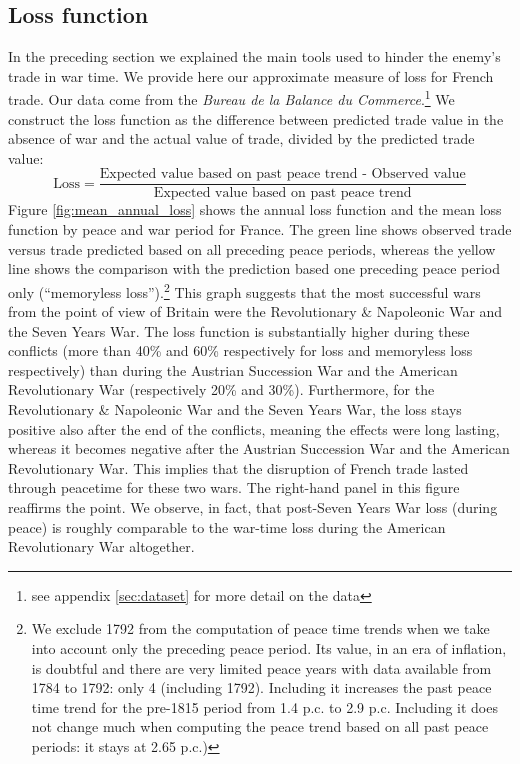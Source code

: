 \documentclass[12pt,a4paper,notitlepage,english]{article}
\begin{document}
\subsection{Loss function}
\label{sec:loss}
In the preceding section we explained the main tools used to hinder the enemy's trade in war time. We provide here our approximate measure of loss for French trade. Our data come from the \textit{Bureau de la Balance du Commerce}.\footnote{see appendix \ref{sec:dataset} for more detail on the data} We construct the loss function as the difference between predicted trade value in the absence of war and the actual value of trade, divided by the predicted trade value:
\begin{equation}
\label{eqn:loss}
\text{Loss} = \frac{\text{Expected value based on past peace trend - Observed value}}{\text{Expected value based on past peace trend}}
\end{equation}
Figure \ref{fig:mean_annual_loss} shows the annual loss function and the mean loss function by peace and war period for France. 
The green line shows observed trade versus trade predicted based on all preceding peace periods, whereas the yellow line shows the comparison with the prediction based one preceding peace period only (``memoryless loss'').\footnote{We exclude 1792 from the computation of peace time trends when we take into account only the preceding peace period. Its value, in an era of inflation, is doubtful and there are very limited peace years with data available from 1784 to 1792: only 4 (including 1792). Including it increases the past peace time trend for the pre-1815 period from 1.4 p.c. to 2.9 p.c. Including it does not change much when computing the peace trend based on all past peace periods: it stays at 2.65 p.c.)}
This graph suggests that the most successful wars from the point of view of Britain were the Revolutionary \& Napoleonic War and the Seven Years War.
The loss function is substantially higher during these conflicts (more than 40\% and 60\% respectively for loss and memoryless loss respectively) than during the Austrian Succession War and the American Revolutionary War (respectively 20\% and 30\%).
Furthermore, for the Revolutionary \& Napoleonic War and the Seven Years War, the loss stays positive also after the end of the conflicts, meaning the effects were long lasting, whereas it becomes negative after the Austrian Succession War and the American Revolutionary War. This implies that the disruption of French trade lasted through peacetime for these two wars. The right-hand panel in this figure reaffirms the point. We observe, in fact, that post-Seven Years War loss (during peace) is roughly comparable to the war-time loss during the American Revolutionary War altogether.
\end{document}
